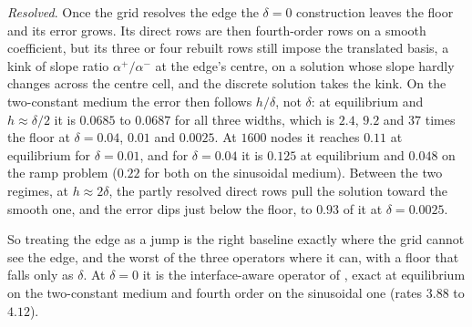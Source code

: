\documentclass[11pt]{amsart}
\theoremstyle{definition}
\theoremstyle{remark}
\newcommand{\para}[1]{\par\smallskip\noindent\textit{#1}.\enspace}
\begin{document}
\para{Resolved}
Once the grid resolves the edge the $\delta = 0$ construction leaves the floor and its
error grows. Its direct rows are then fourth-order rows on a smooth
coefficient, but its three or four rebuilt rows still impose the translated
basis, a kink of slope ratio $\alpha^+ / \alpha^-$ at the edge's centre, on
a solution whose slope hardly changes across the centre cell, and the
discrete solution takes the kink. On the two-constant medium the error then
follows $h / \delta$, not $\delta$: at equilibrium and $h \approx \delta/2$ it
is $0.0685$
to $0.0687$ for all three widths, which is $2.4$, $9.2$ and $37$ times the
floor at $\delta = 0.04$, $0.01$ and $0.0025$. At $1600$ nodes it reaches
$0.11$ at equilibrium for $\delta = 0.01$, and for $\delta = 0.04$ it is
$0.125$ at equilibrium and $0.048$ on the ramp problem ($0.22$ for both on
the sinusoidal medium). Between the two regimes, at $h \approx 2\delta$, the
partly resolved direct rows pull the solution toward the smooth one, and the
error dips just below the floor, to $0.93$ of it at $\delta = 0.0025$.

So treating the edge as a jump is the right baseline exactly where the grid
cannot see the edge, and the worst of the three operators where it can,
with a floor that falls only as $\delta$. At $\delta = 0$ it is the
interface-aware operator of \cite{Martin2016}, exact at equilibrium on the
two-constant medium and fourth order on the sinusoidal one (rates $3.88$ to
$4.12$).
\end{document}
